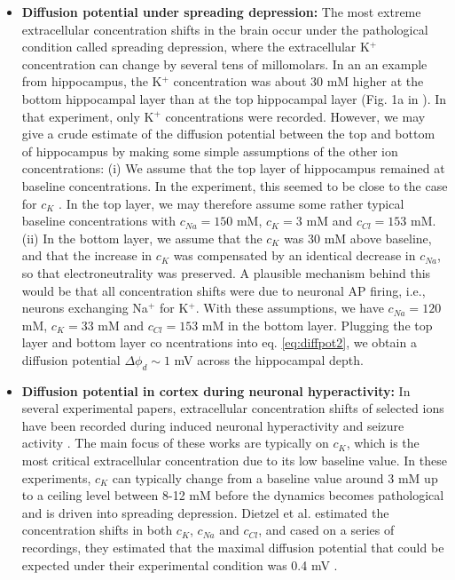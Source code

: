 \begin{itemize}

\item {\bf Diffusion potential under spreading depression:} The most extreme extracellular concentration shifts in the brain occur under the pathological condition called spreading depression, where the extracellular K$^+$ concentration can change by several tens of millomolars. In an an example from hippocampus, the K$^+$ concentration was about 30 mM higher at the bottom hippocampal layer than at the top hippocampal layer (Fig. 1a in \cite{Herreras1993}). In that experiment, only K$^+$ concentrations were recorded. However, we may give a crude estimate of the diffusion potential between the top and bottom of hippocampus by making some simple assumptions of the other ion concentrations: (i) We assume that the top layer of hippocampus remained at baseline concentrations. In the experiment, this seemed to be close to the case for $c_K$ \cite{Herreras1993}. In the top layer, we may therefore assume some rather typical baseline concentrations with $c_{Na} = 150$ mM, $c_{K} = 3$ mM and $c_{Cl} = 153$ mM. (ii) In the bottom layer, we assume that the $c_K$ was 30 mM above baseline, and that the increase in $c_K$ was compensated by an identical decrease in $c_{Na}$, so that electroneutrality was preserved. A plausible mechanism behind this would be that all concentration shifts were due to neuronal AP firing, i.e., neurons exchanging Na$^+$ for K$^+$. With these assumptions, we have $c_{Na} = 120$ mM, $c_{K} = 33$ mM and $c_{Cl} = 153$ mM in the bottom layer. Plugging the top layer and bottom layer co ncentrations into eq. \ref{eq:diffpot2}, we obtain a diffusion potential $\Delta \phi_d \sim 1$ mV across the hippocampal depth.

\item {\bf Diffusion potential in cortex during neuronal hyperactivity:} In several experimental papers, extracellular concentration shifts of selected ions have been recorded during induced neuronal hyperactivity and seizure activity \cite{kriv1975, nicholson1978, Dietzel1982, somjen1986, Dietzel1989}. The main focus of these works are typically on $c_K$, which is the most critical extracellular concentration due to its low baseline value. In these experiments, $c_K$ can typically change from a baseline value around 3 mM up to a ceiling level between 8-12 mM before the dynamics becomes pathological and is driven into spreading depression. Dietzel et al. estimated the concentration shifts in both $c_{K}$, $c_{Na}$ and $c_{Cl}$, and cased on a series of recordings, they estimated that the maximal diffusion potential that could be expected under their experimental condition was 0.4 mV \cite{Dietzel1989}.


\end{itemize}
